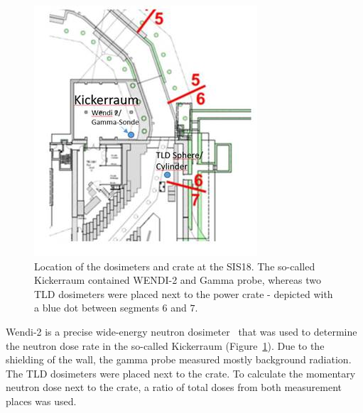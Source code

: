 \begin{figure}[!hbtp]
    \centering
    \includegraphics[width=0.6\columnwidth]{Chapter4/images/septum.jpg}
    \caption{Location of the dosimeters and crate at the SIS18. The so-called Kickerraum contained WENDI-2 and Gamma probe, whereas two TLD dosimeters were placed next to the power crate - depicted with a blue dot between segments $6$ and $7$.}
    \label{fig:spec_des}
\end{figure}

Wendi-2 is a precise wide-energy neutron dosimeter~\cite{wendi} that was used to determine the neutron dose rate in the so-called Kickerraum (Figure~\ref{fig:spec_des}). Due to the shielding of the wall, the gamma probe measured mostly background radiation. The TLD dosimeters were placed next to the crate. To calculate the momentary neutron dose next to the crate, a ratio of total doses from both measurement places was used. 

\newpage
